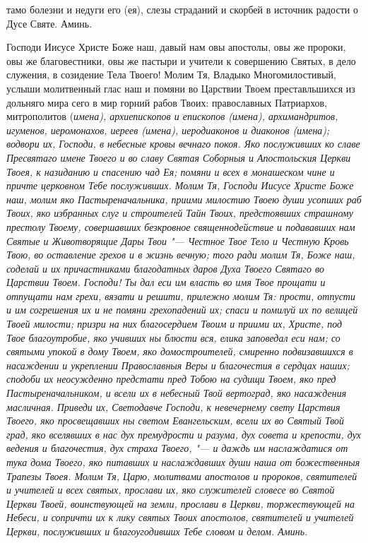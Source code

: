 тамо болезни и недуги его (ея), слезы страданий и скорбей в источник радости о Дусе Святе. Аминь. 


\mychapterending




Господи Иисусе Христе Боже наш, давый нам овы апостолы, овы же пророки, овы же благовестники, овы же пастыри и учители к совершению Святых, в дело служения, в созидение Тела Твоего! Молим Тя, Владыко Многомилостивый, услыши молитвенный глас наш и помяни во Царствии Твоем преставльшихся из дольняго мира сего в мир горний рабов Твоих: православных Патриархов, митрополитов (\itshape имена\normalfont{}), архиепископов и епископов (\itshape имена\normalfont{}), архимандритов, игуменов, иеромонахов, иереев (\itshape имена\normalfont{}), иеродиаконов и диаконов (\itshape имена\normalfont{}); водвори их, Господи, в небесные кровы вечнаго покоя. Яко послуживших ко славе Пресвятаго имене Твоего и во славу Святая Соборныя и Апостольския Церкви Твоея, к назиданию и спасению чад Ея; помяни и всех в монашеском чине и причте церковном Тебе послуживших. Молим Тя, Господи Иисусе Христе Боже наш, молим яко Пастыреначальника, приими милостию Твоею души усопших раб Твоих, яко избранных слуг и строителей Тайн Твоих, предстоявших страшному престолу Твоему, совершавших безкровное священнодействие и подававших нам Святые и Животворящие Дары Твои "--- Честное Твое Тело и Честную Кровь Твою, во оставление грехов и в жизнь вечную; того ради молим Тя, Боже наш, соделай и их причастниками благодатных даров Духа Твоего Святаго во Царствии Твоем. Господи! Ты дал еси им власть во имя Твое прощати и отпущати нам грехи, вязати и решити, прилежно молим Тя: прости, отпусти и им согрешения их и не помяни грехопадений их; спаси и помилуй их по велицей Твоей милости; призри на них благосердием Твоим и приими их, Христе, под Твое благоутробие, яко учивших ны блюсти вся, елика заповедал еси нам; со святыми упокой в дому Твоем, яко домостроителей, смиренно подвизавшихся в насаждении и укреплении Православныя Веры и благочестия в сердцах наших; сподоби их неосужденно предстати пред Тобою на судищи Твоем, яко пред Пастыреначальником, и всели их в небесный Твой вертоград, яко насаждения масличная. Приведи их, Светодавче Господи, к невечернему свету Царствия Твоего, яко просвещавших ны светом Евангельским, всели их во Святый Твой град, яко вселявших в нас дух премудрости и разума, дух совета и крепости, дух ведения и благочестия, дух страха Твоего, "--- и даждь им наслаждатися от тука дома Твоего, яко питавших и наслаждавших души наша от божественныя Трапезы Твоея. Молим Тя, Царю, молитвами апостолов и пророков, святителей и учителей и всех святых, прослави их, яко служителей словесе во Святой Церкви Твоей, воинствующей на земли, прослави в Церкви, торжествующей на Небеси, и сопричти их к лику святых Твоих апостолов, святителей и учителей Церкви, послуживших и благоугодивших Тебе словом и делом. Аминь. 


